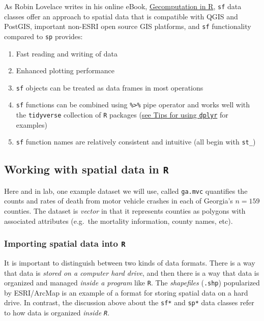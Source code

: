 \documentclass[
]{book}
\providecommand{\tightlist}{%
  \setlength{\itemsep}{0pt}\setlength{\parskip}{0pt}}
\begin{document}
As Robin Lovelace writes in his online eBook, \href{https://geocompr.robinlovelace.net/}{Gecomputation in R}, \texttt{sf} data classes offer an approach to spatial data that is compatible with QGIS and PostGIS, important non-ESRI open source GIS platforms, and \texttt{sf} functionality compared to \texttt{sp} provides:

\begin{enumerate}
\def\labelenumi{\arabic{enumi}.}
\tightlist
\item
  Fast reading and writing of data
\item
  Enhanced plotting performance
\item
  \texttt{sf} objects can be treated as data frames in most operations
\item
  \texttt{sf} functions can be combined using \texttt{\%\textgreater{}\%} pipe operator and works well with the \texttt{tidyverse} collection of \texttt{R} packages (\protect\hyperlink{dplyr}{see Tips for using \texttt{dplyr}} for examples)
\item
  \texttt{sf} function names are relatively consistent and intuitive (all begin with \texttt{st\_})
\end{enumerate}

\hypertarget{working-with-spatial-data-in-r}{%
\subsection{\texorpdfstring{Working with spatial data in \texttt{R}}{Working with spatial data in R}}\label{working-with-spatial-data-in-r}}

Here and in lab, one example dataset we will use, called \texttt{ga.mvc} quantifies the counts and rates of death from motor vehicle crashes in each of Georgia's \(n=159\) counties. The dataset is \emph{vector} in that it represents counties as polygons with associated attributes (e.g.~the mortality information, county names, etc).

\hypertarget{importing-spatial-data-into-r}{%
\subsubsection{\texorpdfstring{Importing spatial data into \texttt{R}}{Importing spatial data into R}}\label{importing-spatial-data-into-r}}

It is important to distinguish between two kinds of data formats. There is a way that data is \emph{stored on a computer hard drive}, and then there is a way that data is organized and managed \emph{inside a program} like \texttt{R}. The \emph{shapefiles} (\texttt{.shp}) popularized by ESRI/ArcMap is an example of a format for storing spatial data on a hard drive. In contrast, the discussion above about the \texttt{sf*} and \texttt{sp*} data classes refer to how data is organized \emph{inside \texttt{R}}.
\end{document}
